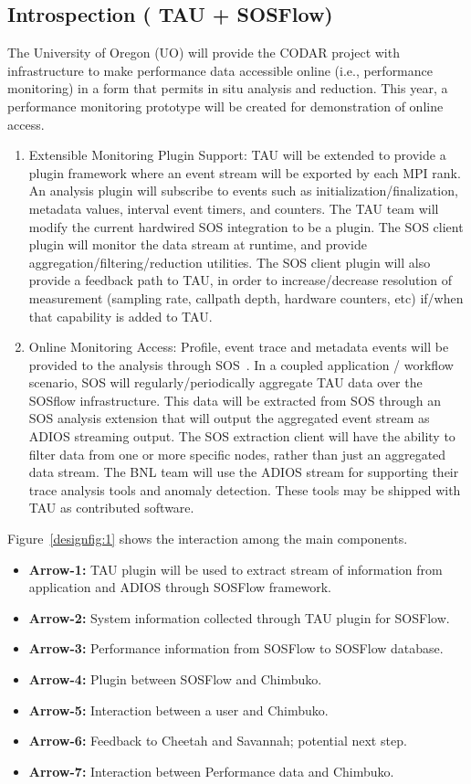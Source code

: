 \subsection{Introspection ( TAU + SOSFlow)}
The University of Oregon (UO) will provide the CODAR project with infrastructure to make performance data accessible online (i.e., performance monitoring) in a form that permits in situ analysis and reduction. This year, a performance monitoring prototype will be created for demonstration of online access. 
\begin{enumerate}
\item Extensible Monitoring Plugin Support: TAU will be extended to provide a plugin framework where an event stream will be exported by each MPI rank. An analysis plugin will subscribe to events such as initialization/finalization, metadata values, interval event timers, and counters.  The TAU team will modify the current hardwired SOS integration to be a plugin. The SOS client plugin will monitor the data stream at runtime, and provide aggregation/filtering/reduction utilities.  The SOS client plugin will also provide a feedback path to TAU, in order to increase/decrease resolution of measurement (sampling rate, callpath depth, hardware counters, etc) if/when that capability is added to TAU.
\item Online Monitoring Access: Profile, event trace and metadata events will be provided to the analysis through SOS~\cite{Chad}. In a coupled application / workflow scenario, SOS will regularly/periodically aggregate TAU data over the SOSflow infrastructure.  This data will be extracted from SOS through an SOS analysis extension that will output the aggregated event stream as ADIOS streaming output.  The SOS extraction client will have the ability to filter data from one or more specific nodes, rather than just an aggregated data stream.  The  BNL team will use the ADIOS stream for supporting their trace analysis tools and anomaly detection. These tools may be shipped with TAU as contributed software.
\end{enumerate}

Figure~\ref{designfig:1} shows the interaction among the main components.

\begin{itemize}

\item {\bf{Arrow-1:}} TAU plugin will be used to extract stream of information from application and ADIOS through SOSFlow framework. 
\item {\bf{Arrow-2:}} System information collected through TAU plugin for SOSFlow.
\item {\bf{Arrow-3:}} Performance information from SOSFlow to SOSFlow database.
\item{\bf{ Arrow-4:}} Plugin between SOSFlow and Chimbuko.
\item {\bf{Arrow-5:}} Interaction between a user and Chimbuko.
\item {\bf{Arrow-6:}} Feedback to Cheetah and Savannah; potential next step.
\item {\bf{Arrow-7:}} Interaction between Performance data and Chimbuko.

\end{itemize}


